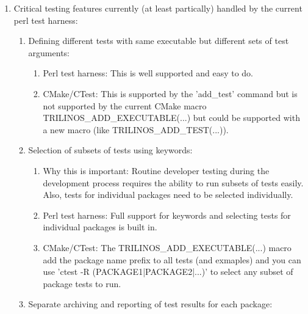 \documentclass[pdf,ps2pdf,11pt]{SANDreport}
\begin{document}
\begin{enumerate}

{}\item Critical testing features currently (at least partically)
handled by the current perl test harness:

  \begin{enumerate}

  {}\item Defining different tests with same executable but different
  sets of test arguments:

    \begin{enumerate}

    {}\item Perl test harness: This is well supported and easy to do.

    {}\item CMake/CTest: This is supported by the 'add\_test' command but is
    not supported by the current CMake macro
    TRILINOS\_ADD\_EXECUTABLE(...) but could be supported with a new
    macro (like TRILINOS\_ADD\_TEST(...)).

    \end{enumerate}

  {}\item Selection of subsets of tests using keywords:

    \begin{enumerate}

    {}\item Why this is important: Routine developer testing during
    the development process requires the ability to run subsets of
    tests easily.  Also, tests for individual packages need to be
    selected individually.

    {}\item Perl test harness: Full support for keywords and selecting
    tests for individual packages is built in.

    {}\item CMake/CTest: The TRILINOS\_ADD\_EXECUTABLE(...) macro add the
    package name prefix to all tests (and exmaples) and you can use
    'ctest -R (PACKAGE1|PACKAGE2|...)' to select any subset of package
    tests to run.

    \end{enumerate}

  {}\item Separate archiving and reporting of test results for each
  package:

    \begin{enumerate}


\end{enumerate}
\end{enumerate}
\end{enumerate}
\end{document}
